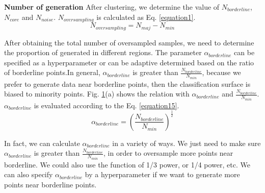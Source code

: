 \documentclass[ida]{iosart2x}
\begin{document}
\textbf{Number of generation} After clustering, 
we determine the value of $N_{borderline}$, 
$N_{core}$ and $N_{noise}$. 
$N_{oversampling}$ is calculated as Eq. \ref{equation1}.
\begin{equation}
  \label{equation1}
  N_{oversampling}=N_{maj}-N_{min}
\end{equation}

After obtaining the total number of oversampled samples, 
we need to determine the proportion of generated 
in different regions.
The parameter $\alpha_{borderline}$ can be specified as a hyperparameter or can be adaptive determined based on the ratio of borderline points.In general, $\alpha_{borderline}$ is greater than $\frac{N_{borderline}}{N_{min}}$,
because we prefer to generate data near borderline points,
then the classification surface is biased to minority points.
Fig. \ref{fig20}(a) shows the relation with $\alpha_{borderline}$ and $\frac{N_{borderline}}{N_{min}}$.
$\alpha_{borderline}$ is evaluated according to the Eq. \ref{equation15}.
\begin{equation}
  \label{equation15}
  \alpha_{borderline}=(\frac{N_{borderline}}{N_{min}})^{\frac{1}{2}}
\end{equation}

In fact, we can calculate $\alpha_{borderline}$ in a variety of ways. 
We just need to make sure $\alpha_{borderline}$ is greater 
than $\frac{N_{borderline}}{N_{min}}$, in order
to oversample more points near borderline. 
We could also use the function of 1/3 power, or 1/4 power, etc.
We can also specify $\alpha_{borderline}$ by a hyperparameter
if we want to generate more points near borderline points.
\begin{figure}[tb]
  \centering
  \quad
  \caption{}
  \label{fig20}
  \end{figure}
\end{document}
